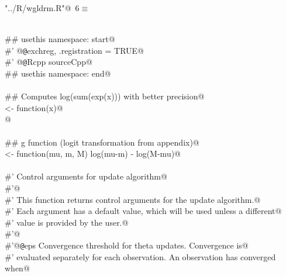 \documentclass[reqno]{amsart}
\renewcommand{\NWtarget}[2]{\hypertarget{#1}{#2}}
\begin{document}
\begin{flushleft} \small\label{scrap3}\raggedright\small
\NWtarget{nuweb6}{} \verb@"../R/wgldrm.R"@\nobreak\ {\footnotesize {6}}$\equiv$
\vspace{-1ex}
\begin{list}{}{} \item
\mbox{}\verb@@\\
\mbox{}\verb@## usethis namespace: start@\\
\mbox{}\verb@#' @{\tt @}\verb@useDynLib exchreg, .registration = TRUE@\\
\mbox{}\verb@#' @{\tt @}\verb@importFrom Rcpp sourceCpp@\\
\mbox{}\verb@## usethis namespace: end@\\
\mbox{}\verb@@\\
\mbox{}\verb@## Computes log(sum(exp(x))) with better precision@\\
\mbox{}\verb@logSumExp <- function(x)@\\
\mbox{}@\\
\mbox{}\verb@@\\
\mbox{}\verb@## g function (logit transformation from appendix)@\\
\mbox{}\verb@g <- function(mu, m, M) log(mu-m) - log(M-mu)@\\
\mbox{}\verb@@\\
\mbox{}\verb@#' Control arguments for \eqn{\theta} update algorithm@\\
\mbox{}\verb@#'@\\
\mbox{}\verb@#' This function returns control arguments for the \eqn{\theta} update algorithm.@\\
\mbox{}\verb@#' Each argument has a default value, which will be used unless a different@\\
\mbox{}\verb@#' value is provided by the user.@\\
\mbox{}\verb@#'@\\
\mbox{}\verb@#'@{\tt @}\verb@param eps Convergence threshold for theta updates. Convergence is@\\
\mbox{}\verb@#' evaluated separately for each observation. An observation has converged when@\\

\end{list}
\end{flushleft}
\end{document}
